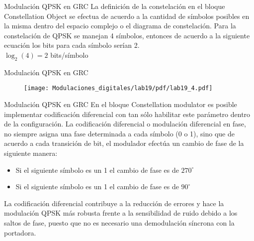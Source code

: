 \begin{frame}{Modulación QPSK en GRC}
\justifying
La definición de la constelación en el bloque Constellation Object se efectua de acuerdo a la cantidad de símbolos posibles en la misma dentro del espacio complejo o el diagrama de constelación. Para la constelación de QPSK se manejan 4 símbolos, entonces de acuerdo a la siguiente ecuación los bits para cada símbolo serían 2.\\
\centering
$\log_{2}(4)=2$ bits/símbolo\\
\end{frame}


\begin{frame}{Modulación QPSK en GRC}
\begin{figure}
\texttt{[image: Modulaciones\_digitales/lab19/pdf/lab19\_4.pdf]}
\end{figure}
\end{frame}

\begin{frame}{Modulación QPSK en GRC}
\justifying
En el bloque Constellation modulator es posible implementar codificación diferencial con tan sólo habilitar este parámetro dentro de la configuración. La codificación diferencial o modulación diferencial en fase, no siempre asigna una fase determinada a cada símbolo (0 o 1), sino que de acuerdo a cada transición de bit, el modulador efectúa un cambio de fase de la siguiente manera:\\
\begin{itemize}
\item Si el siguiente símbolo es un 1 el cambio de fase es de $270^{\circ}$  
\item Si el siguiente símbolo es un 1 el cambio de fase es de $90^{\circ}$
\end{itemize}
La codificación diferencial contribuye a la reducción de errores y hace la modulación QPSK más robusta frente a la sensibilidad de ruido debido a los saltos de fase, puesto que no es necesario una demodulación síncrona con la portadora.\cite{Universidad Militar Nueva Granada}
\end{frame}

